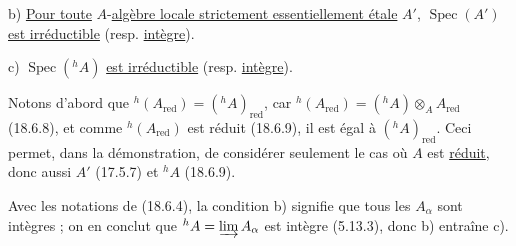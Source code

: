 b) \uline{Pour toute} $A$-\uline{algèbre locale strictement essentiellement étale} $A'$,  $\operatorname{Spec}(A')$ \uline{est irréductible} (resp. \uline{intègre}).

c) $\operatorname{Spec}({}^h A)$ \uline{est irréductible} (resp. \uline{intègre}).

Notons d'abord que ${}^h(A_{\mathrm{red}})=({}^h A)_{\mathrm{red}}$, car  ${}^h(A_{\mathrm{red}})=({}^h A)\otimes_A A_{\mathrm{red}}$ (18.6.8), et comme ${}^h(A_{\mathrm{red}})$ est réduit (18.6.9), il est égal à $({}^h A)_{\mathrm{red}}$. Ceci permet, dans la démonstration, de considérer seulement le cas où $A$ est \uline{réduit}, donc aussi $A'$ (17.5.7) et ${}^h A$ (18.6.9).

 Avec les notations de (18.6.4), la condition b) signifie que tous les $A_\alpha$ sont intègres ;  on en conclut que ${}^h A=\varinjlim A_\alpha$ est intègre (5.13.3), donc b) entraîne c).

